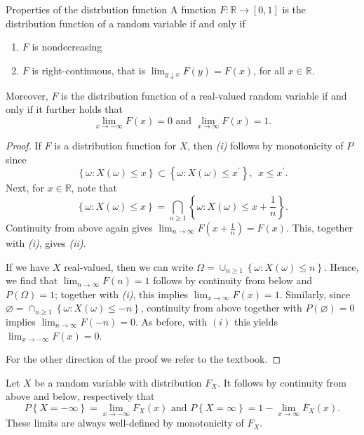 \begin{thrm}{Properties of the distrbution function}{}
A function \( F:\mathbb{R} \to [0,1] \) is the distribution function of a random variable if and only if 
\begin{enumerate}[label = \emph{\roman*.)}]
    \item \( F \) is nondecreasing
    \item \( F \) is right-continuous, that is \( \lim_{y \downarrow x} F(y) = F(x) \), for all \( x \in \mathbb{R}  \).  
\end{enumerate}
Moreover, \( F \) is the distribution function of a real-valued random variable if and only if it further holds that 
\[
    \lim_{x \to - \infty }F(x) = 0  \text{ and } \lim_{x \to \infty} F(x) = 1.
\]
\tcbline

\begin{proof}
If \( F \) is a distribution function for \( X \), then \emph{(i)} follows by monotonicity of \( P \) since 
\[
    \left\{ \omega :X(\omega )\leq x \right\} \subset \left\{ \omega :X(\omega )\leq x^\prime  \right\}, \ \ x \leq x^\prime .
\]
Next, for \( x \in \mathbb{R}  \), note that 
\[
    \left\{ \omega :X(\omega )\leq x \right\}  = \bigcap_{n\geq 1} \left\{ \omega :X(\omega )\leq x + \frac{1}{n}\right\}.
\]
Continuity from above again gives \( \lim_{n \to \infty} F(x + \frac{1}{n}) = F(x). \) This, together with \emph{(i)}, gives \emph{(ii)}.

If we have \( X \) real-valued, then we can write \( \Omega = \cup _{n\geq 1}\left\{ \omega :X(\omega )\leq n \right\}  \). Hence, we find that \( \lim_{n \to \infty} F(n) = 1 \)  follows by continuity from below and \(P(\Omega ) = 1\); together with \emph{(i)}, this implies \( \lim_{x \to \infty} F(x) = 1 \). Similarly, since \( \varnothing = \cap _{n\geq 1}\left\{ \omega :X(\omega )\leq - n \right\}  \), continuity from above together with \( P(\varnothing ) = 0 \) implies \( \lim_{n \to \infty}F(- n) = 0  \). As before, with \( (i) \) this yields \( \lim_{x \to - \infty }F(x) = 0  \). 

For the other direction of the proof we refer to the textbook.
\end{proof}

\end{thrm}



\begin{rmk}{}{}
Let \( X \) be a random variable with distribution \( F_{X}  \). It follows by continuity from above and below, respectively that 
\[
    P\left\{ X = - \infty  \right\}  = \lim_{x \to - \infty }F_{X} (x) \text{ and } P\left\{ X = \infty  \right\}  = 1 - \lim_{x \to \infty} F_{X} (x). 
\]
These limits are always well-defined by monotonicity of $F_X$.
\end{rmk}

